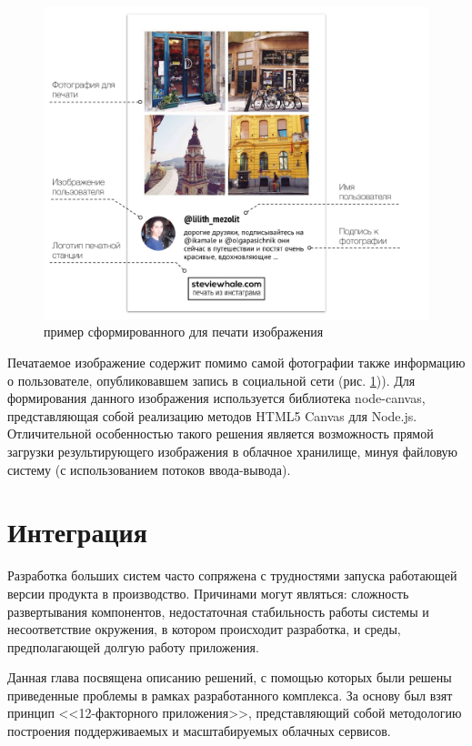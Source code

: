 \documentclass[a4paper,14pt,href]{article}
\begin{document}
\begin{figure}[htbp]
\begin{center}
  \includegraphics[scale=0.65]{photo-layout.pdf}
    \caption{пример сформированного для печати изображения}
    \label{fig:PhotoLayout}
\end{center}
\end{figure}

Печатаемое изображение содержит помимо самой фотографии также информацию о пользователе, опубликовавшем запись
в социальной сети (рис. \ref{fig:PhotoLayout})). Для формирования данного изображения используется библиотека node-canvas,
представляющая собой реализацию методов HTML5 Canvas для Node.js. Отличительной особенностью такого решения является
возможность прямой загрузки результирующего изображения в облачное хранилище, минуя файловую систему (с использованием
потоков ввода-вывода).

\section{Интеграция}
Разработка больших систем часто сопряжена с трудностями запуска работающей версии продукта в производство. Причинами могут
являться: сложность развертывания компонентов, недостаточная стабильность работы системы и несоответствие окружения, в
котором происходит разработка, и среды, предполагающей долгую работу приложения.

Данная глава посвящена описанию решений, с помощью которых были решены приведенные проблемы в рамках разработанного
комплекса. За основу был взят принцип <<12-факторного приложения>>\cite{TwelveFactor}, представляющий собой методологию
построения поддерживаемых и масштабируемых облачных сервисов.
\end{document}
